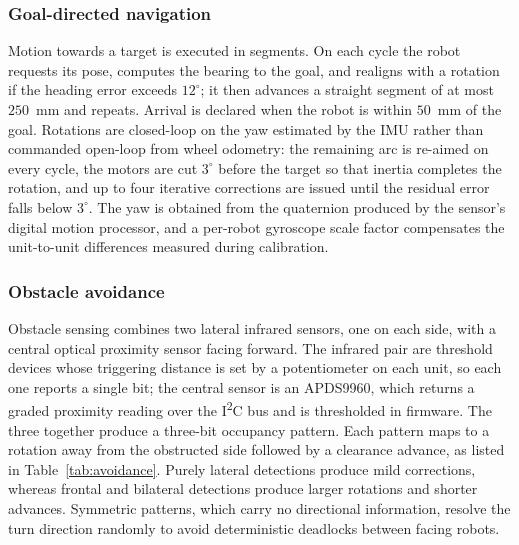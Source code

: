\documentclass[conference]{IEEEtran}
\begin{document}
\subsubsection{Goal-directed navigation}
Motion towards a target is executed in segments. On each cycle the robot
requests its pose, computes the bearing to the goal, and realigns with a
rotation if the heading error exceeds $12^\circ$; it then advances a straight
segment of at most $250$~mm and repeats. Arrival is declared when the robot is
within $50$~mm of the goal. Rotations are closed-loop on the yaw estimated by
the IMU rather than commanded open-loop from wheel odometry: the remaining arc
is re-aimed on every cycle, the motors are cut $3^\circ$ before the target so
that inertia completes the rotation, and up to four iterative corrections are
issued until the residual error falls below $3^\circ$. The yaw is obtained
from the quaternion produced by the sensor's digital motion processor, and a
per-robot gyroscope scale factor compensates the unit-to-unit differences
measured during calibration.

\subsubsection{Obstacle avoidance}
Obstacle sensing combines two lateral infrared sensors, one on each side, with
a central optical proximity sensor facing forward. The infrared pair are
threshold devices whose triggering distance is set by a potentiometer on each
unit, so each one reports a single bit; the central sensor is an APDS9960, which
returns a graded proximity reading over the I\textsuperscript{2}C bus and is
thresholded in firmware. The three together produce a three-bit occupancy
pattern. Each pattern maps to a rotation away from the obstructed side followed by a
clearance advance, as listed in Table~\ref{tab:avoidance}. Purely
lateral detections produce mild corrections, whereas frontal and bilateral
detections produce larger rotations and shorter advances. Symmetric patterns,
which carry no directional information, resolve the turn direction randomly to
avoid deterministic deadlocks between facing robots.
\end{document}
